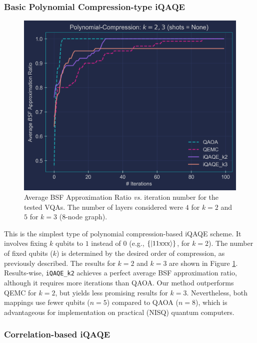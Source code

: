 \subsubsection{Basic Polynomial Compression-type iQAQE}
\label{subsubsection:Basic_Polynomial_iQAQE}
\vspace{-2.5mm}
\begin{figure}[H]
    \centering
    \includegraphics[width=0.95\columnwidth]{Figures/Polynomial_Compression_Base_k2_k3_1.png}
    \caption{Average BSF Approximation Ratio \textit{vs.} iteration number for the tested VQAs. The number of layers considered were $4$ for $k = 2$ and $5$ for $k = 3$ ($8$-node graph).}
    \label{fig:Comparison_k2+k3_2}
\end{figure}
\vspace{-3.5mm}
This is the simplest type of polynomial compression-based iQAQE scheme. It involves fixing $k$ qubits to $1$ instead of $0$ (e.g., $\{\ket{11\text{xxx}}\}$, for $k = 2$). The number of fixed qubits ($k$) is determined by the desired order of compression, as previously described. The results for $k = 2$ and $k = 3$ are shown in Figure \ref{fig:Comparison_k2+k3_2}. Results-wise, \texttt{iQAQE\_k2} achieves a perfect average BSF approximation ratio, although it requires more iterations than QAOA. Our method outperforms QEMC for $k = 2$, but yields less promising results for $k = 3$. Nevertheless, both mappings use fewer qubits ($n = 5$) compared to QAOA ($n = 8$), which is advantageous for implementation on practical (NISQ) quantum computers.

\subsubsection{Correlation-based iQAQE}
\label{subsubsection:Correlation_iQAQE}

